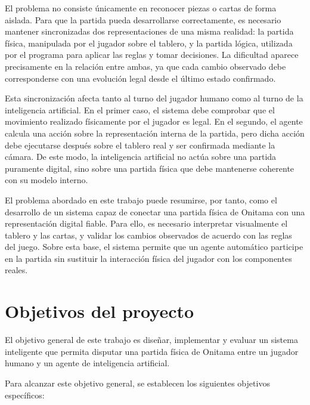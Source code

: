 El problema no consiste únicamente en reconocer piezas o cartas de forma aislada. Para que la partida pueda desarrollarse correctamente, es necesario mantener sincronizadas dos representaciones de una misma realidad: la partida física, manipulada por el jugador sobre el tablero, y la partida lógica, utilizada por el programa para aplicar las reglas y tomar decisiones. La dificultad aparece precisamente en la relación entre ambas, ya que cada cambio observado debe corresponderse con una evolución legal desde el último estado confirmado.

Esta sincronización afecta tanto al turno del jugador humano como al turno de la inteligencia artificial. En el primer caso, el sistema debe comprobar que el movimiento realizado físicamente por el jugador es legal. En el segundo, el agente calcula una acción sobre la representación interna de la partida, pero dicha acción debe ejecutarse después sobre el tablero real y ser confirmada mediante la cámara. De este modo, la inteligencia artificial no actúa sobre una partida puramente digital, sino sobre una partida física que debe mantenerse coherente con su modelo interno.

El problema abordado en este trabajo puede resumirse, por tanto, como el desarrollo de un sistema capaz de conectar una partida física de Onitama con una representación digital fiable. Para ello, es necesario interpretar visualmente el tablero y las cartas, y validar los cambios observados de acuerdo con las reglas del juego. Sobre esta base, el sistema permite que un agente automático participe en la partida sin sustituir la interacción física del jugador con los componentes reales.


\section{Objetivos del proyecto}
\label{sec:objetivos-proyecto}

El objetivo general de este trabajo es diseñar, implementar y evaluar un sistema inteligente que permita disputar una partida física de Onitama entre un jugador humano y un agente de inteligencia artificial.

Para alcanzar este objetivo general, se establecen los siguientes objetivos específicos:

